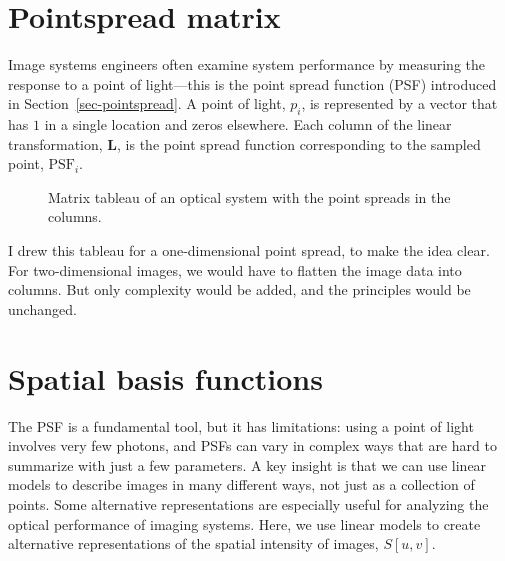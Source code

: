\documentclass[
  letterpaper,
]{book}
\begin{document}
\section{Pointspread matrix}\label{sec-ls-point-matrix}

Image systems engineers often examine system performance by measuring
the response to a point of light---this is the point spread function
(PSF) introduced in Section~\ref{sec-pointspread}. A point of light,
\(p_i\), is represented by a vector that has \(1\) in a single location
and zeros elsewhere. Each column of the linear transformation,
\(\mathbf{L}\), is the point spread function corresponding to the
sampled point, \(\text{PSF}_i\).

\begin{figure}


\caption{\label{fig-ls-matrix-psf}Matrix tableau of an optical system
with the point spreads in the columns.}

\end{figure}%

I drew this tableau for a one-dimensional point spread, to make the idea
clear. For two-dimensional images, we would have to flatten the image
data into columns. But only complexity would be added, and the
principles would be unchanged.

\section{Spatial basis functions}\label{sec-ls-spatial-basis}

The PSF is a fundamental tool, but it has limitations: using a point of
light involves very few photons, and PSFs can vary in complex ways that
are hard to summarize with just a few parameters. A key insight is that
we can use linear models to describe images in many different ways, not
just as a collection of points. Some alternative representations are
especially useful for analyzing the optical performance of imaging
systems. Here, we use linear models to create alternative
representations of the spatial intensity of images, \(S[u,v]\).
\end{document}

